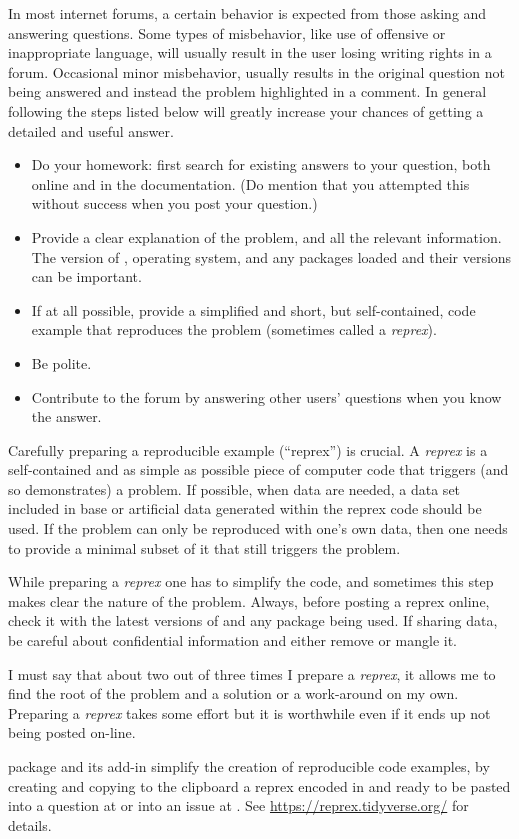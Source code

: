 \documentclass[krantz2]{krantz}\usepackage{knitr}
\begin{document}
In most internet forums, a certain behavior is expected from those asking and answering questions. Some types of misbehavior, like use of offensive or inappropriate language, will usually result in the user losing writing rights in a forum. Occasional minor misbehavior, usually results in the original question not being answered and instead the problem highlighted in a comment. In general following the steps listed below will greatly increase your chances of getting a detailed and useful answer.

\begin{itemize}
  \item Do your homework: first search for existing answers to your question, both online and in the documentation. (Do mention that you attempted this without success when you post your question.)
  \item Provide a clear explanation of the problem, and all the relevant information. The version of \Rpgrm, operating system, and any packages loaded and their versions can be important.
  \item If at all possible, provide a simplified and short, but self-contained, code example that reproduces the problem (sometimes called a \emph{reprex}).
  \item Be polite.
  \item Contribute to the forum by answering other users' questions when you know the answer.
\end{itemize}

\begin{explainbox}
Carefully preparing a reproducible example (``reprex'') is crucial. A \emph{reprex} is a self-contained and as simple as possible piece of computer code that triggers (and so demonstrates) a problem. If possible, when data are needed, a data set included in base \Rpgrm or artificial data generated within the reprex code should be used. If the problem can only be reproduced with one's own data, then one needs to provide a minimal subset of it that still triggers the problem.

While preparing a \emph{reprex} one has to simplify the code, and sometimes this step makes clear the nature of the problem. Always, before posting a reprex online, check it with the latest versions of \Rpgrm and any package being used. If sharing data, be careful about confidential information and either remove or mangle it.

I must say that about two out of three times I prepare a \emph{reprex}, it allows me to find the root of the problem and a solution or a work-around on my own. Preparing a \emph{reprex} takes some effort but it is worthwhile even if it ends up not being posted on-line.

\Rlang package  and its \RStudio add-in simplify the creation of reproducible code examples, by creating and copying to the clipboard a reprex encoded in \Markdown and ready to be pasted into a question at \stackoverflow or into an issue at \GitHub. See \url{https://reprex.tidyverse.org/} for details.
\end{explainbox}
\end{document}

